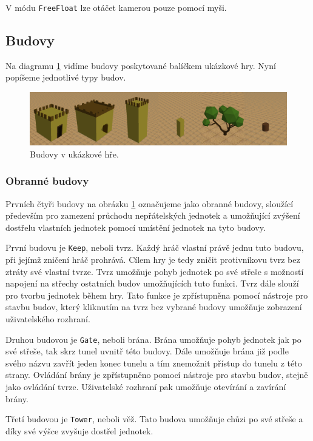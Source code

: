 V módu \texttt{FreeFloat} lze otáčet kamerou pouze pomocí myši.   

\subsection{Budovy}
Na diagramu \ref{fig:buildings} vidíme budovy poskytované balíčkem ukázkové hry. Nyní popíšeme jednotlivé typy budov.

\begin{figure}[h]
	\centering
	\includegraphics[width=\textwidth]{img/Buildings.png}
	\caption{Budovy v ukázkové hře.}
	\label{fig:buildings}
\end{figure}

\subsubsection{Obranné budovy}
\label{sec:defbuildings}
Prvních čtyři budovy na obrázku \ref{fig:buildings} označujeme jako obranné budovy, sloužící především pro zamezení průchodu nepřátelských jednotek a umožňující zvýšení dostřelu vlastních jednotek pomocí umístění jednotek na tyto budovy.

První budovu je \texttt{Keep}, neboli tvrz. Každý hráč vlastní právě jednu tuto budovu, při jejímž zničení hráč prohrává. Cílem hry je tedy zničit protivníkovu tvrz bez ztráty své vlastní tvrze. Tvrz umožňuje pohyb jednotek po své střeše s možností napojení na střechy ostatních budov umožňujících tuto funkci. Tvrz dále slouží pro tvorbu jednotek během hry. Tato funkce je zpřístupněna pomocí nástroje pro stavbu budov, který kliknutím na tvrz bez vybrané budovy umožňuje zobrazení uživatelského rozhraní.

Druhou budovou je \texttt{Gate}, neboli brána. Brána umožňuje pohyb jednotek jak po své střeše, tak skrz tunel uvnitř této budovy. Dále umožňuje brána již podle svého názvu zavřít jeden konec tunelu a tím znemožnit přístup do tunelu z této strany. Ovládání brány je zpřístupněno pomocí nástroje pro stavbu budov, stejně jako ovládání tvrze. Uživatelské rozhraní pak umožňuje otevírání a zavírání brány.

Třetí budovou je \texttt{Tower}, neboli věž. Tato budova umožňuje chůzi po své střeše a díky své výšce zvyšuje dostřel jednotek.

